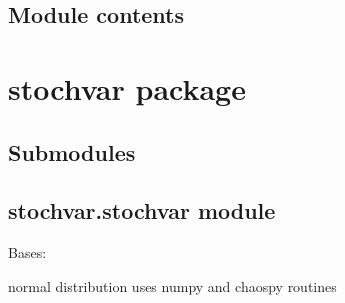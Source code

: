 \documentclass[letterpaper,10pt,english]{sphinxmanual}
\begin{document}
\section{Module contents}
\label{\detokenize{solver:module-solver}}\label{\detokenize{solver:module-contents}}

\chapter{stochvar package}
\label{\detokenize{stochvar:stochvar-package}}\label{\detokenize{stochvar::doc}}

\section{Submodules}
\label{\detokenize{stochvar:submodules}}

\section{stochvar.stochvar module}
\label{\detokenize{stochvar:module-stochvar.stochvar}}\label{\detokenize{stochvar:stochvar-stochvar-module}}

\begin{fulllineitems}
\label{\detokenize{stochvar:stochvar.stochvar.Normal}}
Bases: {\hyperref[\detokenize{stochvar:stochvar.stochvar.StochVar}]{}}

normal distribution
uses numpy and chaospy routines

\begin{fulllineitems}
\label{\detokenize{stochvar:stochvar.stochvar.Normal.defaults_}}
\end{fulllineitems}


\begin{fulllineitems}
\label{\detokenize{stochvar:stochvar.stochvar.Normal.draw_samples}}
\end{fulllineitems}


\end{fulllineitems}
\end{document}
